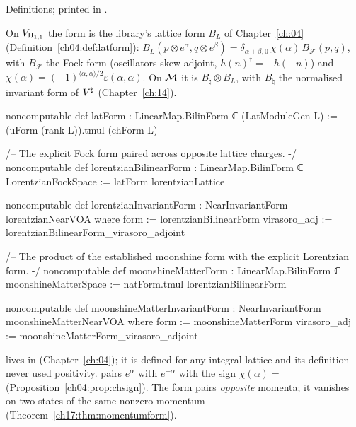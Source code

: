 \begin{status}
Definitions; printed in .
\end{status}

\begin{definition}\label{ch17:def:matterform}
On ${V_{\mathrm{II}_{1,1}}}$ the form is the library's lattice form $B_L$ of Chapter~\ref{ch:04}
(Definition~\ref{ch04:def:latform}): $B_L(p\otimes e^\alpha,q\otimes e^\beta)=\delta_{\alpha+\beta,0}\,\chi(\alpha)\,B_{\mathcal F}(p,q)$, with $B_{\mathcal F}$ the
Fock form (oscillators skew-adjoint, $h(n)^\dagger=-h(-n)$) and $\chi(\alpha)=(-1)^{\langle\alpha,\alpha\rangle/2}\varepsilon(\alpha,\alpha)$.  On
$\mathcal{M}$ it is $B_\natural\otimes B_L$, with $B_\natural$ the normalised invariant form  of ${V^{\natural}}$
(Chapter~\ref{ch:14}).
\end{definition}

\begin{leancode}
noncomputable def latForm : LinearMap.BilinForm ℂ (LatModuleGen L) :=
  (uForm (rank L)).tmul (chForm L)

/-- The explicit Fock form paired across opposite lattice charges. -/
noncomputable def lorentzianBilinearForm : LinearMap.BilinForm ℂ LorentzianFockSpace :=
  latForm lorentzianLattice

noncomputable def lorentzianInvariantForm : NearInvariantForm lorentzianNearVOA where
  form := lorentzianBilinearForm
  virasoro_adj := lorentzianBilinearForm_virasoro_adjoint

/-- The product of the established moonshine form with the explicit Lorentzian form. -/
noncomputable def moonshineMatterForm : LinearMap.BilinForm ℂ moonshineMatterSpace :=
  natForm.tmul lorentzianBilinearForm

noncomputable def moonshineMatterInvariantForm : NearInvariantForm moonshineMatterNearVOA where
  form := moonshineMatterForm
  virasoro_adj := moonshineMatterForm_virasoro_adjoint
\end{leancode}

\begin{dictionary}
 lives in  (Chapter~\ref{ch:04}); it is defined for any integral
lattice and its definition never used positivity.   pairs $e^\alpha$ with $e^{-\alpha}$ with the sign
$\chi(\alpha)=$  (Proposition~\ref{ch04:prop:chsign}).  The form pairs \emph{opposite} momenta; it vanishes on
two states of the same nonzero momentum (Theorem~\ref{ch17:thm:momentumform}).
\end{dictionary}

